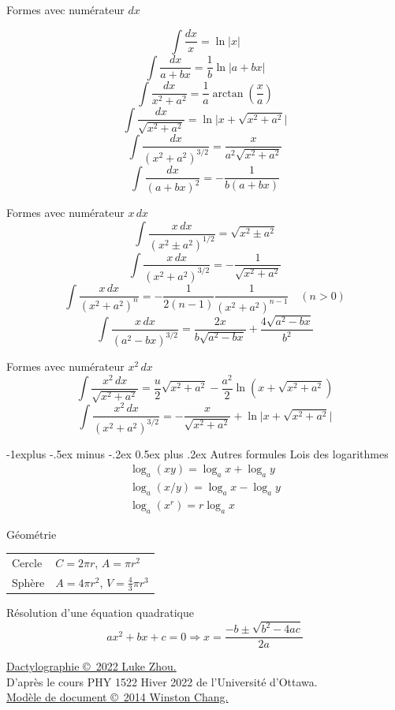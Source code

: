 \documentclass[10pt,landscape]{article}
\makeatletter
\renewcommand{\subsection}{\@startsection{subsection}{2}{0mm}%
                                {-1explus -.5ex minus -.2ex}%
                                {0.5ex plus .2ex}%
                                {\normalfont\normalsize\bfseries}}
\newcommand{\extraline}{\vspace{1em}}
\newcommand{\halfline}{\vspace{0.5em}}
\newcommand{\tableindent}{\hspace{1.5em}}
\makeatother
\begin{document}
\begin{multicols}{3}
\extraline
Formes avec numérateur $dx$ 
\halfline
\begin{multicols}{2}
\noindent
\[ \int \frac{dx}{x} = \ln \lvert x \rvert \]
\[ \int \frac{dx}{a+bx} = \frac{1}{b}\ln\lvert a+bx\rvert \]
\[ \int \frac{dx}{x^2+a^2} = \frac{1}{a}\arctan\left(\frac{x}{a}\right) \]
\[\int \frac{dx}{\sqrt{x^2+a^2}} = \ln \lvert x + \sqrt{x^2+a^2} \rvert \]
\[ \int \frac{dx}{(x^2+a^2)^{3/2}} = \frac{x}{a^2\sqrt{x^2+a^2}} \]
\[ \int \frac{dx}{(a+bx)^2} = -\frac{1}{b(a+bx)} \]
\end{multicols}
%


\extraline
Formes avec numérateur $x\,dx$
\[ \int \frac{x\,dx}{(x^2 \pm a^2)^{1/2}} = \sqrt{x^2 \pm a^2} \]
\[\int \frac{x\,dx}{(x^2+a^2)^{3/2}} = -\frac{1}{\sqrt{x^2+a^2}} \]
\[ \int \frac{x\,dx}{(x^2+a^2)^n} = -\frac{1}{2(n-1)} \frac{1}{(x^2+a^2)^{n-1}} \quad (n>0)  \]
\[ \int \frac{x\,dx}{(a^2-bx)^{3/2}} = \frac{2x}{b\sqrt{a^2-bx}} + \frac{4\sqrt{a^2-bx}}{b^2} \]


Formes avec numérateur $x^2\,dx$
\[ \int \frac{x^2\,dx}{\sqrt{x^2+a^2}} =  \frac{u}{2}\sqrt{x^2+a^2} - \frac{a^2}{2}\ln(x+\sqrt{x^2+a^2}) \]
%
\[ \int \frac{x^2\,dx}{(x^2+a^2)^{3/2}} = -\frac{x}{\sqrt{x^2+a^2}} + \ln \lvert x + \sqrt{x^2+a^2} \rvert \]


\subsection{Autres formules}
Lois des logarithmes
\begin{gather*}
\log_a (xy) = \log_a x + \log_a y \\
 \log_a (x/y) = \log_a x - \log_a y \\
\log_a (x^r) = r\log_a x
\end{gather*}

Géométrie \\
\halfline
\begin{tabular}{@{\tableindent}ll@{}}
	Cercle & $C = 2\pi r $, $A =\pi r^2$ \\
	Sphère & $A = 4\pi r^2$, $V = \frac{4}{3}\pi r^3 $ \\
\end{tabular}
\extraline

Résolution d'une équation quadratique
\[ ax^2 + bx + c = 0 \Longrightarrow x = \frac{-b \pm \sqrt{b^2-4ac} }{2a} \]






\hrulefill


\scriptsize

\href{https://github.com/zhouluke/PhysicsFormulas}{Dactylographie  \copyright\ 2022 Luke Zhou.} \\
D'après le cours PHY 1522 Hiver 2022 de l'Université d'Ottawa. \\
\href{http://wch.github.io/latexsheet/}{Modèle de document \copyright\ 2014 Winston Chang.}


\end{multicols}
\end{document}
